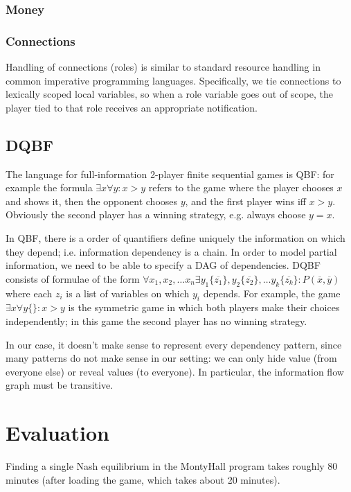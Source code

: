 \documentclass[acmsmall,review,anonymous]{acmart}\settopmatter{printfolios=true,printccs=false,printacmref=false}
\begin{document}
\subsubsection{Money}

\subsubsection{Connections}

Handling of connections (roles) is similar to standard resource handling in common imperative programming languages. Specifically, we tie connections to lexically scoped local variables, so when a role variable goes out of scope, the player tied to that role receives an appropriate notification.

\subsection{DQBF}
The language for full-information 2-player finite sequential games is QBF: for example the formula $\exists x \forall y: x > y$ refers to the game where the player chooses $x$ and shows it, then the opponent chooses $y$, and the first player wins iff $x > y$. Obviously the second player has a winning strategy, e.g. always choose $y=x$.

In QBF, there is a order of quantifiers define uniquely the information on which they depend; i.e. information dependency is a chain. In order to model partial information, we need to be able to specify a DAG of dependencies. DQBF consists of formulae of the form $\forall x_1, x_2, \ldots x_n \exists y_1 \{\overline{z_1}\}, y_2 \{\overline{z_2}\}, \ldots y_k \{\overline{z_k}\}: P(\overline{x}, \overline{y})$ where each $z_i$ is a list of variables on which $y_i$ depends. For example, the game $\exists x \forall y\{\}: x > y$ is the symmetric game in which both players make their choices independently; in this game the second player has no winning strategy.

In our case, it doesn't make sense to represent every dependency pattern, since many patterns do not make sense in our setting: we can only hide value (from everyone else) or reveal values (to everyone). In particular, the information flow graph must be transitive.

\section{Evaluation}

Finding a single Nash equilibrium in the MontyHall program takes roughly 80 minutes (after loading the game, which takes about 20 minutes).
\end{document}
